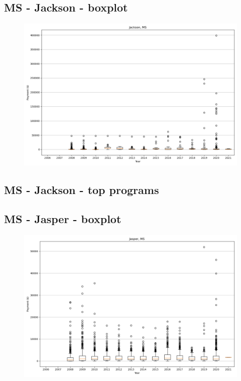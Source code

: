 \subsection*{MS - Jackson - boxplot}
\begin{figure}[h]
\centering
\includegraphics[width=7in]{../output/boxplots/counties/Jackson-MS_boxplot.png}
\end{figure}


\subsection*{MS - Jackson - top programs}

\newpage
\subsection*{MS - Jasper - boxplot}
\begin{figure}[h]
\centering
\includegraphics[width=7in]{../output/boxplots/counties/Jasper-MS_boxplot.png}
\end{figure}


